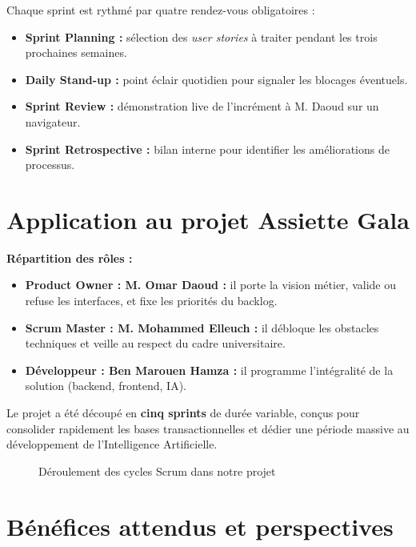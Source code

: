 Chaque sprint est rythmé par quatre rendez-vous obligatoires :

\begin{itemize}
    \item \textbf{Sprint Planning :} sélection des \textit{user stories} à traiter pendant les trois prochaines semaines.
    \item \textbf{Daily Stand-up :} point éclair quotidien pour signaler les blocages éventuels.
    \item \textbf{Sprint Review :} démonstration live de l'incrément à M. Daoud sur un navigateur.
    \item \textbf{Sprint Retrospective :} bilan interne pour identifier les améliorations de processus.
\end{itemize}

\section{Application au projet Assiette Gala}

\textbf{Répartition des rôles :}
\begin{itemize}
    \item \textbf{Product Owner : M. Omar Daoud :} il porte la vision métier, valide ou refuse les interfaces, et fixe les priorités du backlog.
    \item \textbf{Scrum Master : M. Mohammed Elleuch :} il débloque les obstacles techniques et veille au respect du cadre universitaire.
    \item \textbf{Développeur : Ben Marouen Hamza :} il programme l'intégralité de la solution (backend, frontend, IA).
\end{itemize}

Le projet a été découpé en \textbf{cinq sprints} de durée variable, conçus pour consolider rapidement les bases transactionnelles et dédier une période massive au développement de l'Intelligence Artificielle.

\begin{figure}[H]
    \centering
    \caption{Déroulement des cycles Scrum dans notre projet}
    \label{fig:scrum_process}
\end{figure}

\section{Bénéfices attendus et perspectives}

